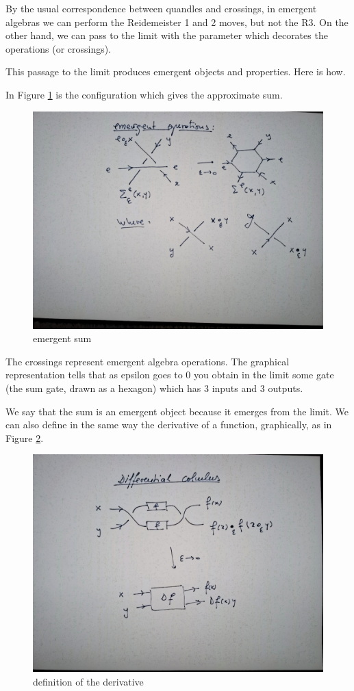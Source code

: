 \documentclass[]{article}
\begin{document}
\vspace{.5cm}

By the usual correspondence between quandles and crossings, in emergent
algebras we can perform the Reidemeister 1 and 2 moves, but not the R3.
On the other hand, we can pass to the limit with the parameter which
decorates the operations (or crossings).

This passage to the limit produces emergent objects and properties. Here
is how.

In Figure \ref{emergent-sum} is the configuration which gives the approximate sum.

\begin{figure}[h!]
\centering
\includegraphics[width=0.75\linewidth]{img/2644.jpg}
\caption{emergent sum}
\label{emergent-sum}
\end{figure}

The crossings represent emergent algebra operations. The graphical
representation tells that as epsilon goes to 0 you obtain in the limit
some gate (the sum gate, drawn as a hexagon) which has 3 inputs and 3
outputs.

We say that the sum is an emergent object because it emerges from the
limit. We can also define in the same way the derivative of a function,
graphically, as in Figure \ref{definition-of-the-derivative}.

\begin{figure}[h!]
\centering
\includegraphics[width=0.75\linewidth]{img/2701.jpg}
\caption{definition of the derivative}
\label{definition-of-the-derivative}
\end{figure}
\end{document}
